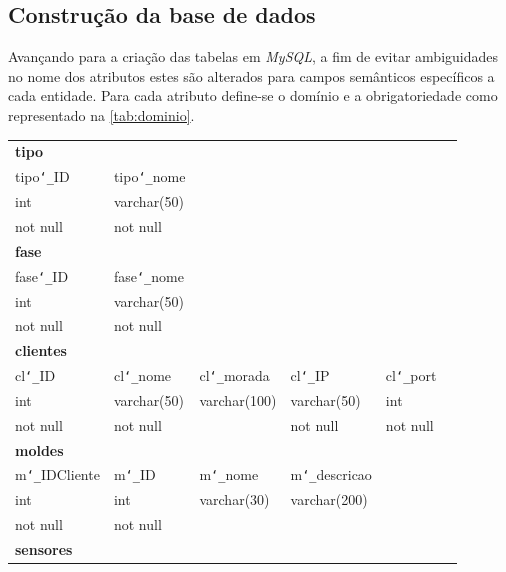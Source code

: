 \documentclass[11pt,twoside,a4paper]{report}
\begin{document}
\subsection{Construção da base de dados}
Avançando para a criação das tabelas em \textit{MySQL}, a fim de evitar ambiguidades no nome dos atributos estes são alterados para campos semânticos específicos a cada entidade. Para cada atributo define-se o domínio e a obrigatoriedade como representado na \autoref{tab:dominio}.
\begin{table}[H]
	\centering
	\begin{tabular}{|l|l|l|l|l|l|}
		\multicolumn{6}{l}{\textbf{tipo}}\\ \cline{1-2}
		tipo\texttt{\char`_}ID & tipo\texttt{\char`_}nome & \multicolumn{4}{l}{}\\ \cline{1-2}
		int & varchar(50) & \multicolumn{4}{l}{}\\ \cline{1-2}
		not null & not null & \multicolumn{4}{l}{}\\ \cline{1-2}
		\multicolumn{6}{l}{\textbf{fase}}\\ \cline{1-2}
		fase\texttt{\char`_}ID & fase\texttt{\char`_}nome & \multicolumn{4}{l}{}\\ \cline{1-2}
		int & varchar(50) & \multicolumn{4}{l}{}\\ \cline{1-2}
		not null & not null & \multicolumn{4}{l}{}\\ \cline{1-2}
		\multicolumn{6}{l}{\textbf{clientes}}\\ \cline{1-5}
		cl\texttt{\char`_}ID & cl\texttt{\char`_}nome & cl\texttt{\char`_}morada & cl\texttt{\char`_}IP & cl\texttt{\char`_}port & \multicolumn{1}{l}{}\\ \cline{1-5}
		int & varchar(50) & varchar(100) & varchar(50) & int & \multicolumn{1}{l}{}\\ \cline{1-5}
		not null & not null & & not null & not null & \multicolumn{1}{l}{}\\ \cline{1-5}
		\multicolumn{6}{l}{\textbf{moldes}}\\ \cline{1-4}
		m\texttt{\char`_}IDCliente & m\texttt{\char`_}ID & 
		m\texttt{\char`_}nome & 
		m\texttt{\char`_}descricao & \multicolumn{2}{l}{}\\ \cline{1-4}
		int & int & varchar(30) & varchar(200) & \multicolumn{2}{l}{}\\ \cline{1-4}
		not null & not null & & &  \multicolumn{2}{l}{}\\ \cline{1-4}
		\multicolumn{6}{l}{\textbf{sensores}}\\ \cline{1-5}

\end{tabular}
\end{table}
\end{document}
